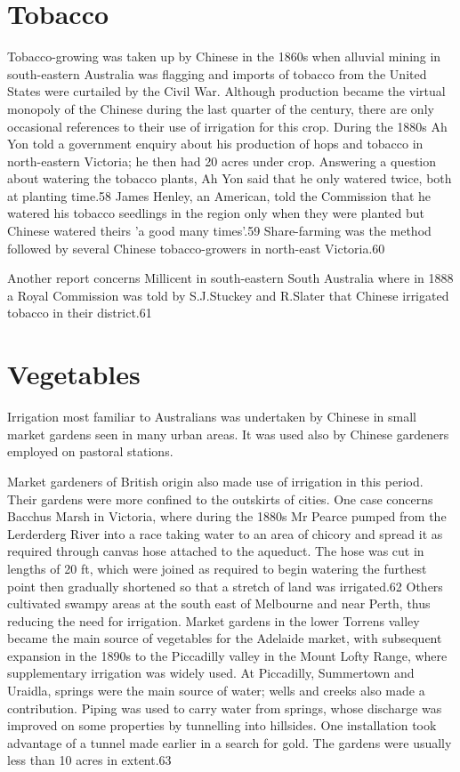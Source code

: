 \section{Tobacco}

Tobacco-growing was taken up by Chinese in the 1860s when alluvial
mining in south-eastern Australia was flagging and imports of tobacco
from the United States were curtailed by the Civil War. Although
production became the virtual monopoly of the Chinese during the last
quarter of the century, there are only occasional references to their
use of irrigation for this crop. During the 1880s Ah Yon told a
government enquiry about his production of hops and tobacco in
north-eastern Victoria; he then had 20 acres under crop. Answering a
question about watering the tobacco plants, Ah Yon said that he only
watered twice, both at planting time.58 James Henley, an American,
told the Commission that he watered his tobacco seedlings in the
region only when they were planted but Chinese watered theirs 'a good
many times'.59 Share-farming was the method followed by several
Chinese tobacco-growers in north-east Victoria.60

Another report concerns Millicent in south-eastern South Australia
where in 1888 a Royal Commission was told by S.J.Stuckey and R.Slater
that Chinese irrigated tobacco in their district.61

\section{Vegetables}

Irrigation most familiar to Australians was undertaken by Chinese in
small market gardens seen in many urban areas. It was used also by
Chinese gardeners employed on pastoral stations.

Market gardeners of British origin also made use of irrigation in this
period. Their gardens were more confined to the outskirts of
cities. One case concerns Bacchus Marsh in Victoria, where during the
1880s Mr Pearce pumped from the Lerderderg River into a race taking
water to an area of chicory and spread it as required through canvas
hose attached to the aqueduct. The hose was cut in lengths of 20 ft,
which were joined as required to begin watering the furthest point
then gradually shortened so that a stretch of land was irrigated.62
Others cultivated swampy areas at the south east of Melbourne and near
Perth, thus reducing the need for irrigation. Market gardens in the
lower Torrens valley became the main source of vegetables for the
Adelaide market, with subsequent expansion in the 1890s to the
Piccadilly valley in the Mount Lofty Range, where supplementary
irrigation was widely used. At Piccadilly, Summertown and Uraidla,
springs were the main source of water; wells and creeks also made a
contribution. Piping was used to carry water from springs, whose
discharge was improved on some properties by tunnelling into
hillsides. One installation took advantage of a tunnel made earlier in
a search for gold. The gardens were usually less than 10 acres in
extent.63

